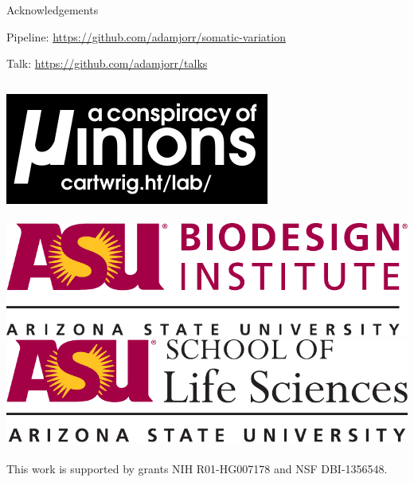 \documentclass{beamer}
\begin{document}
\begin{frame}{Acknowledgements}

Pipeline:  \url{https://github.com/adamjorr/somatic-variation}

Talk:  \url{https://github.com/adamjorr/talks}

\vfill

\begin{columns}
	\includegraphics[width=.9\linewidth]{lab_logo.pdf}
	\\~\\
	\includegraphics[width=.9\linewidth]{biodesign_logo.pdf}
	\includegraphics[width=.9\linewidth]{sols_logo.pdf}
	\\~\\
	This work is supported by grants NIH R01-HG007178 and NSF DBI-1356548.
\end{columns}

\end{frame}

\end{document}
